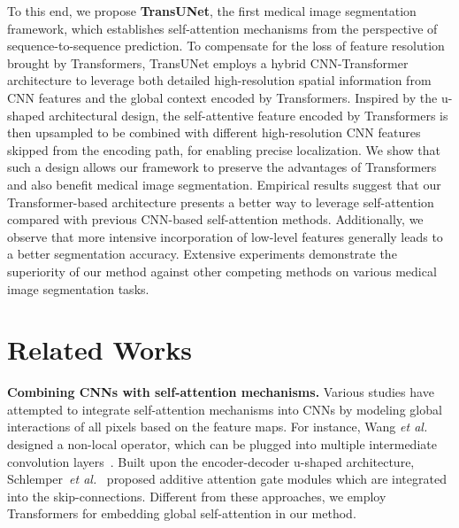 \documentclass[runningheads]{llncs}
\newcommand{\yan}[1]{\textcolor{red}{\small [#1 --yan]}}
\begin{document}
To this end, we propose \textbf{TransUNet}, the first medical image segmentation framework, which establishes self-attention mechanisms from the perspective of sequence-to-sequence prediction.
To compensate for the loss of feature resolution brought by Transformers, TransUNet employs a hybrid CNN-Transformer architecture to leverage both detailed high-resolution spatial information from CNN features and the global context encoded by Transformers.
Inspired by the u-shaped architectural design, the self-attentive feature encoded by Transformers is then upsampled to be combined with different high-resolution CNN features skipped from the encoding path, for enabling precise localization. %
We show that such a design allows our framework to preserve the advantages of Transformers and %
also benefit medical image segmentation. %
Empirical results suggest that our Transformer-based architecture presents a better way to leverage self-attention compared with previous CNN-based self-attention methods.
Additionally, we observe that more intensive incorporation of low-level features generally leads to a better segmentation accuracy. 
Extensive experiments demonstrate the superiority of our method against other competing methods on various medical image segmentation tasks.


\section{Related Works}
\noindent\textbf{Combining CNNs with self-attention mechanisms.}
Various studies have attempted to integrate self-attention mechanisms into CNNs by modeling global interactions of all pixels based on the feature maps. For instance, Wang \emph{et al.} designed a non-local operator, which can be plugged into multiple intermediate convolution layers~\cite{wang2018non}. Built upon the encoder-decoder u-shaped architecture, Schlemper~\emph{et al.}~\cite{schlemper2019attention} proposed additive attention gate modules which are integrated into the skip-connections.
Different from these approaches, we employ Transformers for embedding global self-attention in our method.
\end{document}
